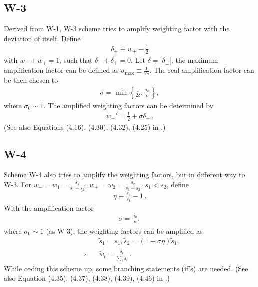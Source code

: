 \documentclass[11pt,dvips]{article}
\numberwithin{equation}{section}
\begin{document}
\subsection{W-3}

Derived from W-1, W-3 scheme tries to amplify weighting factor with the
deviation of itself.
Define
\begin{align}
  \delta_{\pm} \equiv w_{\pm} - \frac{1}{2} \label{e:W3_delta}
\end{align}
with $w_- + w_+ = 1$, such that $\delta_- + \delta_+ = 0$.
Let $\delta = |\delta_{\pm}|$, the maximum amplification factor can be
defined as $\sigma_{\text{max}} \equiv \frac{1}{2\delta}$.
The real amplification factor can be then chosen to
\begin{align}
  \sigma = \min\left\{\frac{1}{2\delta}, \frac{\sigma_0}{|\nu|}\right\},
    \label{e:W3_sigma}
\end{align}
where $\sigma_0\sim1$.
The amplified weighting factors can be determined by
\begin{align}
  w_{\pm}' = \frac{1}{2} + \sigma\delta_{\pm}\,. \label{e:W3_w}
\end{align}
(See also Equations (4.16), (4.30), (4.32), (4.25) in
\cite{chang_multi-dimensional_2003}.)

\subsection{W-4}

Scheme W-4 also tries to amplify the weighting factors, but in different
way to W-3.
For $w_- = w_1 = \frac{s_1}{s_1+s_2}$, $w_+ = w_2 = \frac{s_2}{s_1+s_2}$,
$s_1<s_2$, define
\begin{align}
  \eta \equiv \frac{s_2}{s_1} - 1\,. \label{e:W4_eta}
\end{align}
With the amplification factor
\begin{align}
  \sigma = \frac{\sigma_0}{|\nu|}, \label{e:W4_sigma}
\end{align}
where $\sigma_0 \sim 1$ (as W-3), the weighting factors can be amplified
as
\begin{align}
  &\tilde{s}_1 = s_1, \tilde{s}_2 = (1+\sigma\eta)\tilde{s}_1,
    \label{e:W4_s} \\
  \Rightarrow\quad &\tilde{w}_l = \frac{\tilde{s}_l}{\sum_i\tilde{s}_i}
    \label{e:W4_w} \,.
\end{align}
While coding this scheme up, some branching statements (if's) are
needed.
(See also Equation (4.35), (4.37), (4.38), (4.39), (4.46) in
\cite{chang_multi-dimensional_2003}.)
\end{document}
